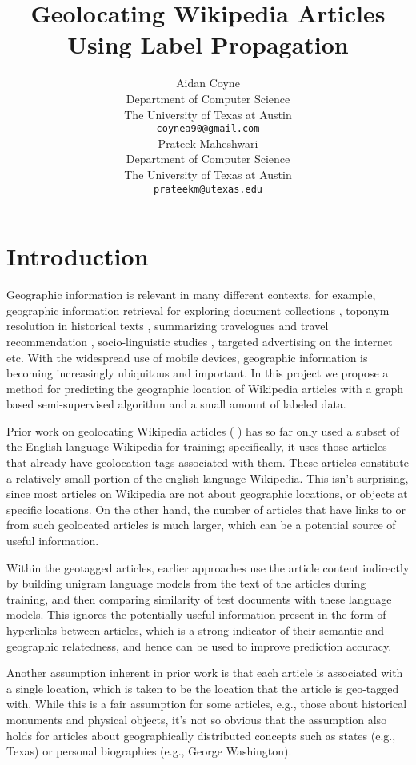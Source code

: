 \documentclass[11pt]{article}
\title{Geolocating Wikipedia Articles Using Label Propagation}
\author{
  Aidan Coyne \\
    Department of Computer Science\\
    The University of Texas at Austin\\
  {\tt coynea90@gmail.com} \\ 
  \And
  Prateek Maheshwari\\
    Department of Computer Science\\
    The University of Texas at Austin\\
  {\tt prateekm@utexas.edu}
}
\date{}
\newcommand{\comment}[1]{}
\begin{document}
\maketitle



\section{Introduction}
\comment{You can now enclose text in a comment block to comment it out inline}
Geographic information is relevant in many different contexts, for example, geographic information retrieval for exploring document collections \cite{}, 
toponym resolution in historical texts \cite{perseus project},  summarizing travelogues and travel recommendation \cite{hao-et-al:10},
socio-linguistic studies \cite{eisenstein-smith-xing:11}, targeted advertising on the internet etc. With the widespread use of mobile devices, geographic information is becoming increasingly 
ubiquitous and important. In this project we propose a method for predicting the geographic location of Wikipedia articles 
with a graph based semi-supervised algorithm and a small amount of labeled data.

Prior work on geolocating Wikipedia articles (\cite{wing-baldridge:11} \cite{rolleretal:12}) has so far only used 
a subset of the English language Wikipedia for training; specifically, it uses those articles that already have geolocation tags associated with them.  
These articles constitute a relatively small portion of the english language Wikipedia. \comment{find actual figure}
This isn't surprising, since most articles on Wikipedia are not about geographic locations, or objects at specific locations.
On the other hand, the number of articles that have links to or from such geolocated articles is much larger, 
which can be a potential source of useful information. \comment{ find figure  of the Wikipedia corpus}

Within the geotagged articles, earlier approaches use the article content indirectly by building unigram language models from the text of the articles during training,
and then comparing similarity of test documents with these language models. This ignores the potentially useful information present in the form of hyperlinks between articles,
which is a strong indicator of their semantic and geographic relatedness, and hence can be used to improve prediction accuracy.

Another assumption inherent in prior work is that each article is associated with a single location, which is taken to be the location that the article is geo-tagged with. 
While this is a fair assumption for some articles, e.g., those about historical monuments and physical objects, it's not so obvious that the assumption also holds for articles about 
geographically distributed concepts such as states (e.g., Texas) or personal biographies (e.g., George Washington). 
\end{document}
